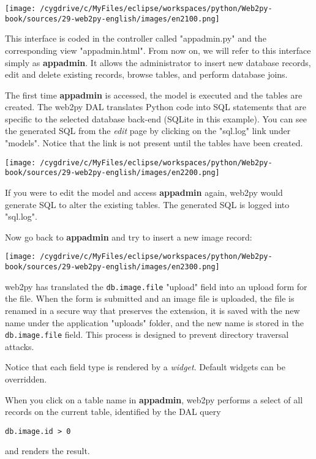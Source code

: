 \documentclass[justified,sixbynine,notoc]{tufte-book}
\def\ft{\small\tt}
\begin{document}
\begin{fullwidth}
\goodbreak\begin{center}\texttt{[image: /cygdrive/c/MyFiles/eclipse/workspaces/python/Web2py-book/sources/29-web2py-english/images/en2100.png]}\end{center}


This interface is coded in the controller called "appadmin.py" and the corresponding view "appadmin.html". From now on, we will refer to this interface simply as {\bf appadmin}. It allows the administrator to insert new database records, edit and delete existing records, browse tables, and perform database joins.

The first time {\bf appadmin} is accessed, the model is executed and the tables are created. The web2py DAL translates Python code into SQL statements that are specific to the selected database back-end (SQLite in this example). You can see the generated SQL from the {\it edit} page by clicking on the "sql.log" link under "models". Notice that the link is not present until the tables have been created.


\goodbreak\begin{center}\texttt{[image: /cygdrive/c/MyFiles/eclipse/workspaces/python/Web2py-book/sources/29-web2py-english/images/en2200.png]}\end{center}


If you were to edit the model and access {\bf appadmin} again, web2py would generate SQL to alter the existing tables. The generated SQL is logged into "sql.log".

Now go back to {\bf appadmin} and try to insert a new image record:


\goodbreak\begin{center}\texttt{[image: /cygdrive/c/MyFiles/eclipse/workspaces/python/Web2py-book/sources/29-web2py-english/images/en2300.png]}\end{center}

\noindent web2py has translated the {\ft db.image.file} "upload" field into an upload form for the file. When the form is submitted and an image file is uploaded, the file is renamed in a secure way that preserves the extension, it is saved with the new name under the application "uploads" folder, and the new name is stored in the {\ft db.image.file} field. This process is designed to prevent directory traversal attacks.

Notice that each field type is rendered by a {\it widget}. Default widgets can be overridden.

When you click on a table name in {\bf appadmin}, web2py performs a select of all records on the current table, identified by the DAL query
\begin{lstlisting}
db.image.id > 0
\end{lstlisting}
\noindent and renders the result.



\end{fullwidth}
\end{document}
